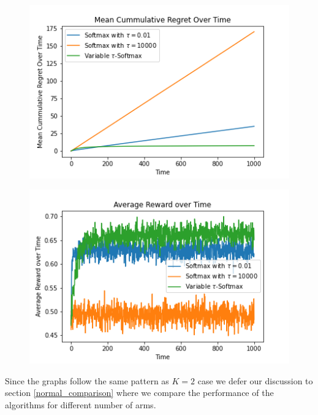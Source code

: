 \documentclass{article}
\begin{document}
		\begin{figure}[H]
		\graphicspath{ {../Experiments/Normal_10_0.01_All/} }
		\centering
		\begin{minipage}{.5\textwidth}
		  \centering
		  \includegraphics[width=\linewidth]{Mean_Cummulative_Regret_Over_Time.png}
		  \label{fig:test1}
		\end{minipage}%
		\begin{minipage}{.5\textwidth}
		  \centering
		  \includegraphics[width=\linewidth]{Average_Reward_over_Time.png}
		  \label{fig:test2}
		\end{minipage}
		\end{figure}
		
		Since the graphs follow the same pattern as $K=2$ case we defer our discussion to section \ref{normal_comparison} where we compare the performance of the algorithms for
		different number of arms.
		
\end{document}
